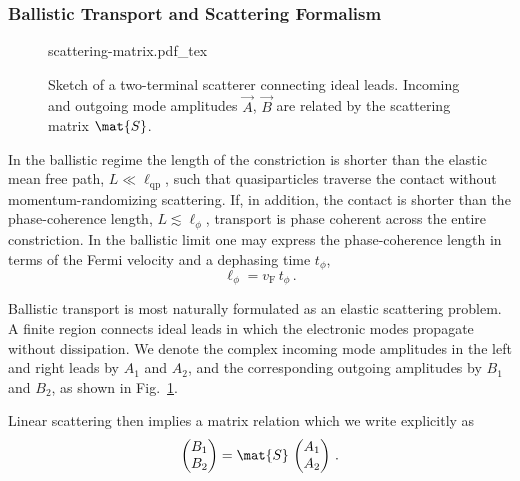         \subsubsection*{Ballistic Transport and Scattering Formalism}
            
            \begin{figure}
                \captionsetup{format=plain}%
                \centering
                \vspace{-1em} %
                {scattering-matrix.pdf_tex}
                \vspace{-.25em} %
                \caption{
                    Sketch of a two-terminal scatterer connecting ideal leads. Incoming and outgoing mode amplitudes $\vec{A}$, $\vec{B}$ are related by the scattering matrix $\mat{S}$.
                }
                \label{fig:basics:scatter}
            \end{figure}
            In the ballistic regime the length of the constriction is shorter than the elastic mean free path, $L \ll \ell_\mathrm{qp}$, such that quasiparticles traverse the contact without momentum-randomizing scattering. If, in addition, the contact is shorter than the phase-coherence length, $L \lesssim \ell_\phi$, transport is phase coherent across the entire constriction. In the ballistic limit one may express the phase-coherence length in terms of the Fermi velocity and a dephasing time $t_\phi$,
            \begin{equation}
                \ell_\phi = v_\mathrm{F} \, t_\phi\,.
                \label{eq:basics:ballistic-coherence-length}
            \end{equation}

            Ballistic transport is most naturally formulated as an elastic scattering problem. A finite region connects ideal leads in which the electronic modes propagate without dissipation. We denote the complex incoming mode amplitudes in the left and right leads by $A_1$ and $A_2$, and the corresponding outgoing amplitudes by $B_1$ and $B_2$, as shown in Fig.~\ref{fig:basics:scatter}.
            
            Linear scattering then implies a matrix relation which we write explicitly as
            \begin{equation}
                \begin{pmatrix} B_1 \\ B_2 \end{pmatrix} = \mat{S}\,\begin{pmatrix} A_1 \\ A_2 \end{pmatrix}\,.
                \label{eq:basics:scatter-1}
            \end{equation}

